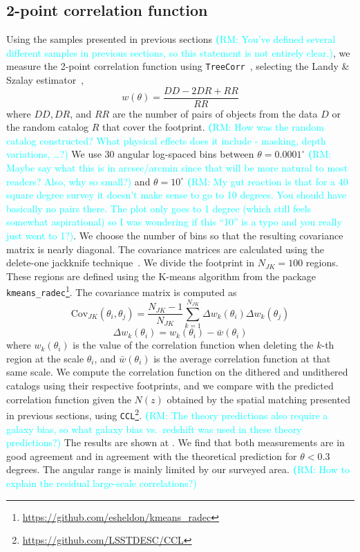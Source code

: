 \documentclass[twocolumn]{aastex62}
\newcommand{\rachel}[1]{{\textcolor{cyan}{{\textbf (RM: #1)}}}}
\begin{document}
\subsection{2-point correlation function}
Using the samples presented in previous sections \rachel{You've defined several different samples in previous sections, so this statement is not entirely clear.}, we measure the 2-point correlation function using \texttt{TreeCorr}~\citep{2004MNRAS.352..338J}, selecting the Landy \& Szalay estimator~\citep{1993ApJ...412...64L},
\begin{equation}
w(\theta) = \frac{DD - 2 DR + RR}{RR}
\end{equation}
where $DD, DR$, and $RR$ are the number of pairs of objects from the data $D$ or the random catalog $R$ that cover the footprint. \rachel{How was the random catalog constructed?  What physical effects does it include - masking, depth variations, \dots?} We use 30 angular log-spaced bins between $\theta=0.0001^{\circ}$ \rachel{Maybe say what this is in arcsec/arcmin since that will be more natural to most readers?  Also, why so small?} and $\theta=10^{\circ}$ \rachel{My gut reaction is that for a 40 square degree survey it doesn't make sense to go to 10 degrees.  You should have basically no pairs there.  The plot only goes to 1 degree (which still feels somewhat aspirational) so I was wondering if this  ``10'' is a typo and you really just went to 1?}. We choose the number of bins so that the resulting covariance matrix is nearly diagonal. The covariance matrices are calculated using the delete-one jackknife technique~\citep{Shao:1986:DJB,2009MNRAS.396...19N}. We divide the footprint in $N_{JK}=100$ regions. These regions are defined using the K-means algorithm from the package \texttt{kmeans\_radec}\footnote{\url{https://github.com/esheldon/kmeans\_radec}}. The covariance matrix is computed as
\begin{equation}
\mathrm{Cov}_{JK}(\theta_{i},\theta_{j})=\frac{N_{JK}-1}{N_{JK}}\sum_{k=1}^{N_{JK}}\Delta w_{k}(\theta_{i}) \Delta w_{k}(\theta_{j})
\end{equation}
\begin{equation}
\Delta w_{k}(\theta_{i}) = w_{k}(\theta_{i})-\bar{w}(\theta_{i})
\end{equation}
where $w_{k}(\theta_{i})$ is the value of the correlation function when deleting the $k$-th region at the scale $\theta_{i}$, and $\bar{w}(\theta_{i})$ is the average correlation function at that same scale. We compute the correlation function on the dithered and undithered catalogs using their respective footprints, and we compare with the predicted correlation function given the $N(z)$ obtained by the spatial matching presented in previous sections, using \texttt{CCL}\footnote{\url{https://github.com/LSSTDESC/CCL}}\citep{2018arXiv181205995C}. \rachel{The theory predictions also require a galaxy bias, so what galaxy bias vs.\ redshift was used in these theory predictions?} The results are shown at . We find that both measurements are in good agreement and in agreement with the theoretical prediction for $\theta < 0.3$ degrees. The angular range is mainly limited by our surveyed area. \rachel{How to explain the residual large-scale correlations?}
\end{document}
